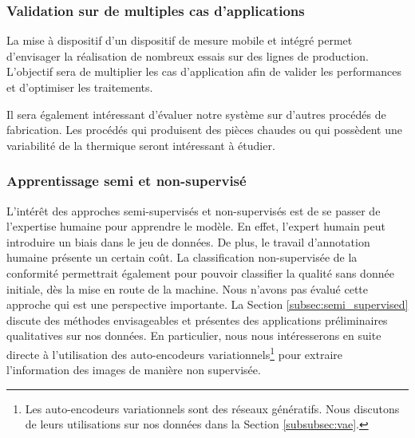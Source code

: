 
\subsubsection{Validation sur de multiples cas d'applications}
La mise à dispositif d'un dispositif de mesure mobile et intégré permet d'envisager la réalisation de nombreux essais sur des lignes de production.
L'objectif sera de multiplier les cas d'application afin de valider les performances et d'optimiser les traitements.

Il sera également intéressant d'évaluer notre système sur d'autres procédés de fabrication.
Les procédés qui produisent des pièces chaudes ou qui possèdent une variabilité de la thermique seront intéressant à étudier.

\subsubsection{Apprentissage semi et non-supervisé}
L'intérêt des approches semi-supervisés et non-supervisés est de se passer de l'expertise humaine pour apprendre le modèle.
En effet, l'expert humain peut introduire un biais dans le jeu de données.
De plus, le travail d'annotation humaine présente un certain coût.
La classification non-supervisée de la conformité permettrait également pour pouvoir classifier la qualité sans donnée initiale, dès la mise en route de la machine.
Nous n'avons pas évalué cette approche qui est une perspective importante.
La Section \ref{subsec:semi_supervised} discute des méthodes envisageables et présentes des applications préliminaires qualitatives sur nos données.
En particulier, nous nous intéresserons en suite directe à l'utilisation des auto-encodeurs variationnels\footnote{Les auto-encodeurs variationnels sont des réseaux génératifs. Nous discutons de leurs utilisations sur nos données dans la Section \ref{subsubsec:vae}.} pour extraire l'information des images de manière non supervisée.

